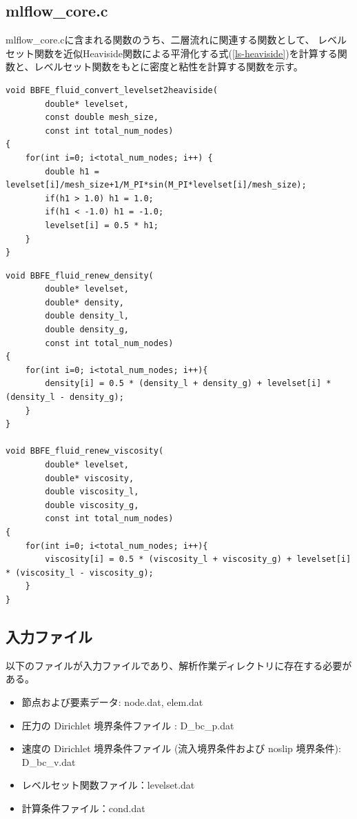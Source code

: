 \documentclass[8pt,a4paper]{article}
\begin{document}
\subsection{mlflow\_core.c}
mlflow\_core.cに含まれる関数のうち、二層流れに関連する関数として、
レベルセット関数を近似Heaviside関数による平滑化する式(\ref{ls-heaviside})を計算する関数と、レベルセット関数をもとに密度と粘性を計算する関数を示す。

\begin{lstlisting}[caption = mlflow\_core.cのレベルセット関数の近似Heaviside関数による平滑化計算]
void BBFE_fluid_convert_levelset2heaviside(
		double* levelset,
		const double mesh_size,
		const int total_num_nodes)
{
	for(int i=0; i<total_num_nodes; i++) {
		double h1 = levelset[i]/mesh_size+1/M_PI*sin(M_PI*levelset[i]/mesh_size);
		if(h1 > 1.0) h1 = 1.0;
		if(h1 < -1.0) h1 = -1.0;
		levelset[i] = 0.5 * h1;
	}
}
\end{lstlisting}

\begin{lstlisting}[caption = mlflow\_core.cの密度と粘性の計算]
void BBFE_fluid_renew_density(
		double* levelset,
		double* density,
		double density_l,
		double density_g,
		const int total_num_nodes)
{
	for(int i=0; i<total_num_nodes; i++){
		density[i] = 0.5 * (density_l + density_g) + levelset[i] * (density_l - density_g);
	}
}

void BBFE_fluid_renew_viscosity(
		double* levelset,
		double* viscosity,
		double viscosity_l,
		double viscosity_g,
		const int total_num_nodes)
{
	for(int i=0; i<total_num_nodes; i++){
		viscosity[i] = 0.5 * (viscosity_l + viscosity_g) + levelset[i] * (viscosity_l - viscosity_g);
	}
}
\end{lstlisting}

\subsection{入力ファイル}
以下のファイルが入力ファイルであり、解析作業ディレクトリに存在する必要がある。
\begin{itemize}
	\item 節点および要素データ: node.dat, elem.dat
	\item 圧力の Dirichlet 境界条件ファイル : D\_bc\_p.dat
	\item 速度の Dirichlet 境界条件ファイル (流入境界条件および noslip 境界条件): D\_bc\_v.dat
	\item レベルセット関数ファイル：levelset.dat
	\item 計算条件ファイル：cond.dat
\end{itemize}
\end{document}
